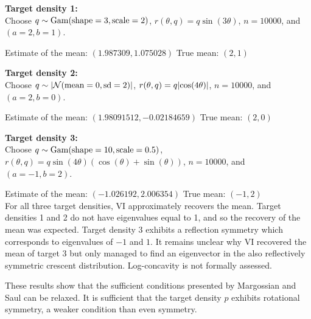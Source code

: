 \documentclass{article}
\begin{document}
\textbf{Target density 1:} \\
Choose $q \sim {\mathrm{Gam}}(\text{shape} = 3, \text{scale} = 2)$, $r(\theta, q) = q \sin(3 \theta)$, $n = 10000$, and $(a = 2, b = 1)$.

Estimate of the mean: $(1.987309, 1.075028)$ \hspace{1cm} True mean: $(2, 1)$



\textbf{Target density 2:} \\
Choose $q \sim \lvert\mathcal{N}(\text{mean} = 0, \text{sd} = 2)\rvert$, $r(\theta, q) = q \lvert\cos(4 \theta)\rvert$, $n = 10000$, and $(a = 2, b = 0)$.

Estimate of the mean: $(1.98091512, -0.02184659)$ \hspace{1cm} True mean: $(2, 0)$



\textbf{Target density 3:} \\
Choose $q \sim {\mathrm{Gam}}(\text{shape} = 10, \text{scale} = 0.5)$, $r(\theta, q) = q \sin(4 \theta) (\cos(\theta) + \sin(\theta))$, $n = 10000$, and $(a = -1, b = 2)$.

Estimate of the mean: $(-1.026192,  2.006354)$ \hspace{1cm} True mean: $(-1, 2)$ \\


For all three target densities, VI approximately recovers the mean.
Target densities 1 and 2 do not have eigenvalues equal to 1, and so the recovery of the mean was expected.
Target density 3 exhibits a reflection symmetry which corresponds to eigenvalues of $-1$ and $1$.
It remains unclear why VI recovered the mean of target 3 but only managed to find an eigenvector in the also reflectively symmetric crescent distribution.
Log-concavity is not formally assessed.

These results show that the sufficient conditions presented by Margossian and Saul can be relaxed.
It is sufficient that the target density $p$ exhibits rotational symmetry, a weaker condition than even symmetry.
\end{document}
